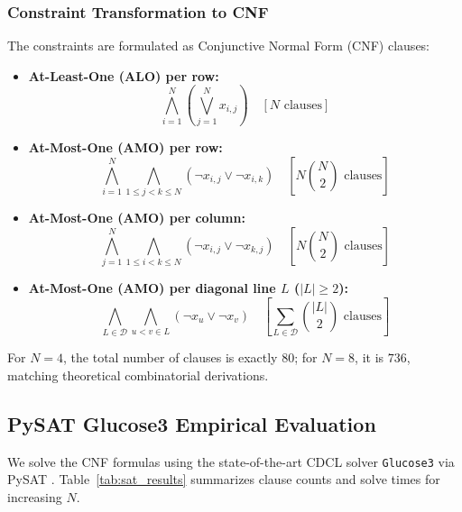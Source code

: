 \documentclass[conference]{IEEEtran}
\begin{document}
\subsubsection{Constraint Transformation to CNF}
The constraints are formulated as Conjunctive Normal Form (CNF) clauses:
\begin{itemize}
    \item \textbf{At-Least-One (ALO) per row:}
    \begin{equation}
        \bigwedge_{i=1}^N \left( \bigvee_{j=1}^N x_{i,j} \right) \quad [N \text{ clauses}]
    \end{equation}
    \item \textbf{At-Most-One (AMO) per row:}
    \begin{equation}
        \bigwedge_{i=1}^N \bigwedge_{1 \le j < k \le N} (\neg x_{i,j} \vee \neg x_{i,k}) \quad \left[ N \binom{N}{2} \text{ clauses} \right]
    \end{equation}
    \item \textbf{At-Most-One (AMO) per column:}
    \begin{equation}
        \bigwedge_{j=1}^N \bigwedge_{1 \le i < k \le N} (\neg x_{i,j} \vee \neg x_{k,j}) \quad \left[ N \binom{N}{2} \text{ clauses} \right]
    \end{equation}
    \item \textbf{At-Most-One (AMO) per diagonal line $L$ ($|L| \ge 2$):}
    \begin{equation}
        \bigwedge_{L \in \mathcal{D}} \bigwedge_{u < v \in L} (\neg x_u \vee \neg x_v) \quad \left[ \sum_{L \in \mathcal{D}} \binom{|L|}{2} \text{ clauses} \right]
    \end{equation}
\end{itemize}

For $N=4$, the total number of clauses is exactly $80$; for $N=8$, it is $736$, matching theoretical combinatorial derivations.

\subsection{PySAT Glucose3 Empirical Evaluation}
We solve the CNF formulas using the state-of-the-art CDCL solver \texttt{Glucose3} \cite{glucose3} via PySAT \cite{pysat2018}. Table~\ref{tab:sat_results} summarizes clause counts and solve times for increasing $N$.
\end{document}

